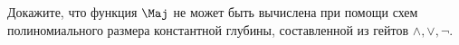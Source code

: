 Докажите, что функция $\Maj$ не может быть вычислена при помощи схем полиномиального размера константной
глубины, составленной из гейтов $\land, \lor, \neg$.
